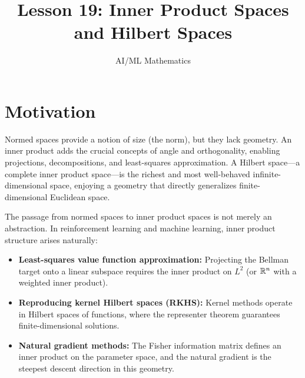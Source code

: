 \documentclass[11pt,a4paper]{article}
\title{Lesson 19: Inner Product Spaces and Hilbert Spaces}
\author{AI/ML Mathematics}
\date{}
\begin{document}
\maketitle
\tableofcontents
\newpage


\section{Motivation}
\label{sec:motivation}

Normed spaces provide a notion of size (the norm), but they lack geometry.
An inner product adds the crucial concepts of angle and orthogonality,
enabling projections, decompositions, and least-squares approximation. A
Hilbert space---a complete inner product space---is the richest and most
well-behaved infinite-dimensional space, enjoying a geometry that directly
generalizes finite-dimensional Euclidean space.

The passage from normed spaces to inner product spaces is not merely an
abstraction. In reinforcement learning and machine learning, inner product
structure arises naturally:
\begin{itemize}[leftmargin=2em,nosep]
    \item \textbf{Least-squares value function approximation:} Projecting
          the Bellman target onto a linear subspace requires the inner product
          on $L^2$ (or $\mathbb{R}^n$ with a weighted inner product).
    \item \textbf{Reproducing kernel Hilbert spaces (RKHS):} Kernel methods
          operate in Hilbert spaces of functions, where the representer
          theorem guarantees finite-dimensional solutions.
    \item \textbf{Natural gradient methods:} The Fisher information matrix
          defines an inner product on the parameter space, and the natural
          gradient is the steepest descent direction in this geometry.
\end{itemize}
\end{document}
